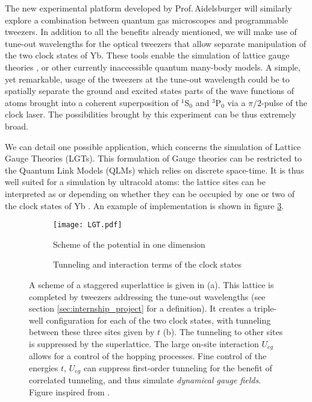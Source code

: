\documentclass[11pt]{article}
\numberwithin{equation}{section}
\numberwithin{figure}{section}
\begin{document}
The new experimental platform developed by Prof.$\,$Aidelsburger will similarly explore a combination between quantum gas microscopes and programmable tweezers. In addition to all the benefits already mentioned, we will make use of tune-out wavelengths for the optical tweezers that allow separate manipulation of the two clock states of Yb. These tools enable the simulation of  lattice gauge theories \citep{2013_wiese}, or other currently inaccessible quantum many-body models. A simple, yet remarkable, usage of the tweezers at the tune-out wavelength could be to spatially separate the ground and excited states parts of the wave functions of atoms brought into a coherent superposition of $^1$S$_0$ and $^3$P$_0$ via a $\pi/2$-pulse of the clock laser. The possibilities brought by this experiment can be thus extremely broad. 

We can detail one possible application, which concerns the simulation of Lattice Gauge Theories (LGTs). This formulation of Gauge theories can be restricted to the Quantum Link Models (QLMs) which relies on discrete space-time. It is thus well suited for a simulation by ultracold atoms: the lattice sites can be interpreted as  or  depending on whether they can be occupied by one or two of the clock states of Yb \citep[see][]{2013_Banerjee, 2018_aidelsburger}. An example of implementation is shown in figure \ref{fig:LGT}. 

%
\begin{figure}[htb]
	\centering
	\begin{subfigure}[b]{0.49\textwidth}
		\centering
		\texttt{[image: LGT.pdf]}
		\vspace{0.4cm}
		\caption{\small Scheme of the potential in one dimension}
		\label{fig:LGT_1}
	\end{subfigure}
	\begin{subfigure}[b]{0.49\textwidth}
    	\centering
    	\small
		\def\svgwidth{0.8\linewidth}
	    
		\caption{\small Tunneling and interaction terms of the clock states}
		\label{fig:LGT_2}
	\end{subfigure}	
	\caption{\small A scheme of a staggered superlattice is given in (a). This lattice is completed by tweezers addressing the tune-out wavelengths (see section \ref{sec:internship_project} for a definition). It creates a triple-well configuration for each of the two clock states, with tunneling between these three sites given by $t$ (b). The tunneling to other sites is suppressed by the superlattice. The large on-site interaction $U_{eg}$ allows for a control of the hopping processes. Fine control of the energies $t$, $U_{eg}$ can suppress first-order tunneling for the benefit of correlated tunneling, and thus simulate \emph{dynamical gauge fields}. Figure inspired from \cite{2018_aidelsburger}.}
    \label{fig:LGT}
\end{figure}
%
\end{document}
